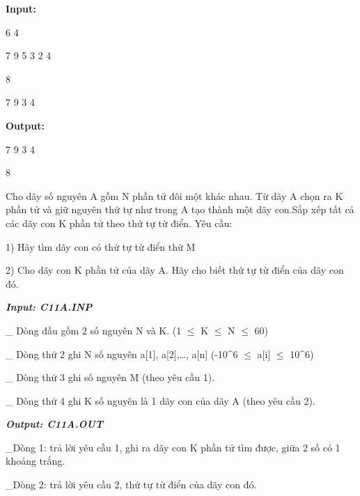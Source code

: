 \textbf{    Input:   }

   6 4  

   7 9 5 3 2 4  

   8  

   7 9 3 4  



\textbf{    Output:   }



   7 9 3 4  

   8  



    Cho dãy số nguyên A gồm N phần tử đôi một khác nhau. Từ dãy A chọn ra K phần tử và giữ nguyên thứ tự như trong A tạo thành một dãy con.Sắp xếp tất cả các dãy con K phần tử theo thứ tự từ điển. Yêu cầu:   

    1) Hãy tìm dãy con có thứ tự từ điển thứ M   

    2) Cho dãy con K phần tử của dãy A. Hãy cho biết thứ tự từ điển của dãy con đó.   

\textbf{\emph{      Input: C11A.INP     }}

    \_ Dòng đầu gồm 2 số nguyên N và K. (1  $\le$  K  $\le$  N  $\le$  60)   

    \_ Dòng thứ 2 ghi N số nguyên a[1], a[2],…, a[n] (-10^6  $\le$  a[i]  $\le$  10^6)   

    \_ Dòng thứ 3 ghi số nguyên M (theo yêu cầu 1).   

    \_ Dòng thứ 4 ghi K số nguyên là 1 dãy con của dãy A (theo yêu cầu 2).   

\textbf{\emph{      Output: C11A.OUT     }}

    \_Dòng 1: trả lời yêu cầu 1, ghi ra dãy con K phần tử tìm được, giữa 2 số có 1 khoảng trắng.   

    \_Dòng 2: trả lời yêu cầu 2, thứ tự từ điển của dãy con đó.